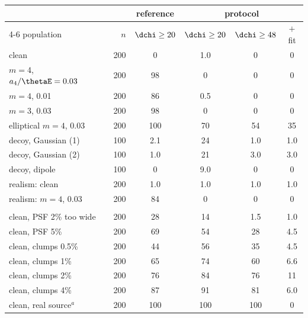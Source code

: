 \begin{tabular}[t]{@{}lrcccc@{}}
\toprule
 & & reference & \multicolumn{3}{c}{protocol} \\ \cmidrule(lr){4-6}
population & $n$ & $\dchi\ge20$ & $\dchi\ge20$ & $\dchi\ge48$ & $+$fit \\
\midrule
clean & 200 & 0 & 1.0 & 0 & 0 \\
$m{=}4$, $a_4/\thetaE=0.03$ & 200 & 98 & 0 & 0 & 0 \\
$m{=}4$, 0.01 & 200 & 86 & 0.5 & 0 & 0 \\
$m{=}3$, 0.03 & 200 & 98 & 0 & 0 & 0 \\
elliptical $m{=}4$, 0.03 & 200 & 100 & 70 & 54 & 35 \\
decoy, Gaussian (1) & 100 & 2.1 & 24 & 1.0 & 1.0 \\
decoy, Gaussian (2) & 100 & 1.0 & 21 & 3.0 & 3.0 \\
decoy, dipole & 100 & 0 & 9.0 & 0 & 0 \\
realism: clean & 200 & 1.0 & 1.0 & 1.0 & 1.0 \\
realism: $m{=}4$, 0.03 & 200 & 84 & 0 & 0 & 0 \\
\addlinespace\multicolumn{6}{@{}l}{\emph{forward-model variants, exact model otherwise}} \\
clean, PSF 2\% too wide & 200 & 28 & 14 & 1.5 & 1.0 \\
clean, PSF 5\% & 200 & 69 & 54 & 28 & 4.5 \\
clean, clumps 0.5\% & 200 & 44 & 56 & 35 & 4.5 \\
clean, clumps 1\% & 200 & 65 & 74 & 60 & 6.6 \\
clean, clumps 2\% & 200 & 76 & 84 & 76 & 11 \\
clean, clumps 4\% & 200 & 87 & 91 & 81 & 6.0 \\
clean, real source$^{a}$ & 200 & 100 & 100 & 100 & 0 \\
\bottomrule
\end{tabular}
\hfill
